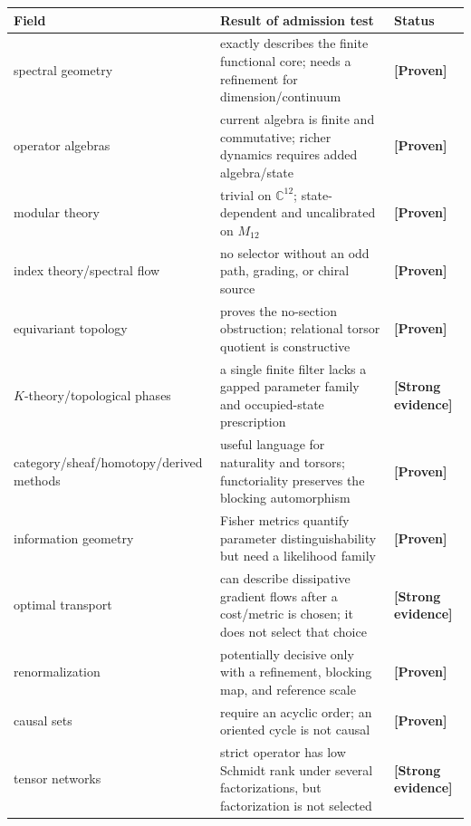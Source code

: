 \documentclass[11pt,a4paper,openany]{report}
\newcommand{\statusProven}{\textcolor{fingreen}{[Proven]}}
\newcommand{\statusStrong}{\textcolor{finblue}{[Strong evidence]}}
\begin{document}
\begin{center}
\begingroup\small
\setlength{\tabcolsep}{3.5pt}
\renewcommand{\arraystretch}{1.16}
\begin{longtable}{@{}p{}p{}p{}@{}}
\toprule
\textbf{Field} & \textbf{Result of admission test} & \textbf{Status} \\
\midrule
\endhead
spectral geometry & exactly describes the finite functional core; needs a refinement for dimension/\allowbreak{}continuum & \textbf{\statusProven{}} \\
operator algebras & current algebra is finite and commutative; richer dynamics requires added algebra/\allowbreak{}state & \textbf{\statusProven{}} \\
modular theory & trivial on \(\mathbb C^{12}\); state-dependent and uncalibrated on \(M_{12}\) & \textbf{\statusProven{}} \\
index theory/\allowbreak{}spectral flow & no selector without an odd path, grading, or chiral source & \textbf{\statusProven{}} \\
equivariant topology & proves the no-section obstruction; relational torsor quotient is constructive & \textbf{\statusProven{}} \\
\(K\)-theory/\allowbreak{}topological phases & a single finite filter lacks a gapped parameter family and occupied-state prescription & \textbf{\statusStrong{}} \\
category/\allowbreak{}sheaf/\allowbreak{}homotopy/\allowbreak{}derived methods & useful language for naturality and torsors; functoriality preserves the blocking automorphism & \textbf{\statusProven{}} \\
information geometry & Fisher metrics quantify parameter distinguishability but need a likelihood family & \textbf{\statusProven{}} \\
optimal transport & can describe dissipative gradient flows after a cost/\allowbreak{}metric is chosen; it does not select that choice & \textbf{\statusStrong{}} \\
renormalization & potentially decisive only with a refinement, blocking map, and reference scale & \textbf{\statusProven{}} \\
causal sets & require an acyclic order; an oriented cycle is not causal & \textbf{\statusProven{}} \\
tensor networks & strict operator has low Schmidt rank under several factorizations, but factorization is not selected & \textbf{\statusStrong{}} \\

\end{longtable}
\end{center}
\end{document}
